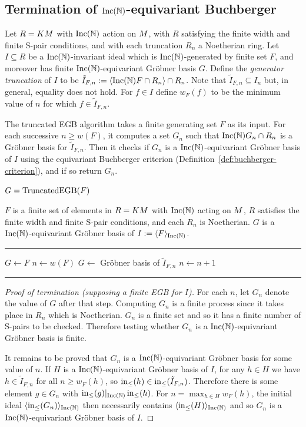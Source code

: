 \subsection{Termination of $\operatorname{Inc}(\mathbb N)$-equivariant Buchberger}
Let $R = KM$ with $\operatorname{Inc}(\mathbb N)$ action on $M$, with $R$ satisfying the finite width and finite S-pair conditions, and with each truncation $R_n$ a Noetherian ring.  Let $I \subseteq R$ be a $\operatorname{Inc}(\mathbb N)$-invariant ideal which is $\operatorname{Inc}(\mathbb N)$-generated by finite set $F$, and moreover has finite $\operatorname{Inc}(\mathbb N)$-equivariant Gr\"obner basis $G$.  Define the {\em generator truncation} of $I$ to be $\tilde{I}_{F,n} := \langle \operatorname{Inc}(\mathbb N) F \cap R_n \rangle \cap R_n$.  Note that $\tilde{I}_{F,n} \subseteq I_n$ but, in general, equality does not hold.  For $f \in I$ define $w_F(f)$ to be the minimum value of $n$ for which $f \in \tilde{I}_{F,n}$.

The truncated EGB algorithm takes a finite generating set $F$ as its input.  For each successive $n \geq w(F)$, it computes a set $G_n$ such that $\operatorname{Inc}(\mathbb N) G_n \cap R_n$ is a Gr\"obner basis for $\tilde{I}_{F,n}$.  Then it checks if $G_n$ is a $\operatorname{Inc}(\mathbb N)$-equivariant Gr\"obner basis of $I$ using the equivariant Buchberger criterion (Definition~\ref{def:buchberger-criterion}), and if so return $G_n$.

\begin{algorithm}\label{alg:truncBuch}
$G = \operatorname{TruncatedEGB}(F)$
\begin{algorithmic}[1]
\REQUIRE $F$ is a finite set of elements in $R = KM$ with $\operatorname{Inc}(\mathbb N)$ acting on $M$, $R$ satisfies the finite width and finite S-pair conditions, and each $R_n$ is Noetherian.
\ENSURE $G$ is a $\operatorname{Inc}(\mathbb N)$-equivariant Gr\"obner basis of $I := \langle F \rangle_{\operatorname{Inc}(\mathbb N)}$.

\smallskip \hrule \smallskip

\STATE $G\gets F$
\STATE $n\gets w(F)$
	\STATE $G\gets$ Gr\"obner basis of $\tilde{I}_{F,n}$
	\STATE $n \gets n+1$
\ENDWHILE
\smallskip \hrule \smallskip
\end{algorithmic}
\end{algorithm}

\begin{proof}[Proof of termination (supposing a finite EGB for $I$)]
For each $n$, let $G_n$ denote the value of $G$ after that step.  Computing $G_n$ is a finite process since it takes place in $R_n$ which is Noetherian.  $G_n$ is a finite set and so it has a finite number of S-pairs to be checked.  Therefore testing whether $G_n$ is a $\operatorname{Inc}(\mathbb N)$-equivariant Gr\"obner basis is finite.

It remains to be proved that $G_n$ is a $\operatorname{Inc}(\mathbb N)$-equivariant Gr\"obner basis for some value of $n$.  If $H$ is a $\operatorname{Inc}(\mathbb N)$-equivariant Gr\"obner basis of $I$, for any $h \in H$ we have $h \in \tilde{I}_{F,n}$ for all $n \geq w_F(h)$, so $\operatorname{in}_{\leq}(h) \in \operatorname{in}_{\leq}(\tilde{I}_{F,n})$.  Therefore there is some element $g \in G_n$ with $\operatorname{in}_{\leq}(g)|_{\operatorname{Inc}(\mathbb N)} \operatorname{in}_{\leq}(h)$.  For $n = \max_{h\in H} w_F(h)$, the initial ideal $\langle \operatorname{in}_{\leq}(G_n) \rangle_{\operatorname{Inc}(\mathbb N)}$ then necessarily contains $\langle \operatorname{in}_{\leq}(H) \rangle_{\operatorname{Inc}(\mathbb N)}$ and so $G_n$ is a $\operatorname{Inc}(\mathbb N)$-equivariant Gr\"obner basis of $I$.
\end{proof}

